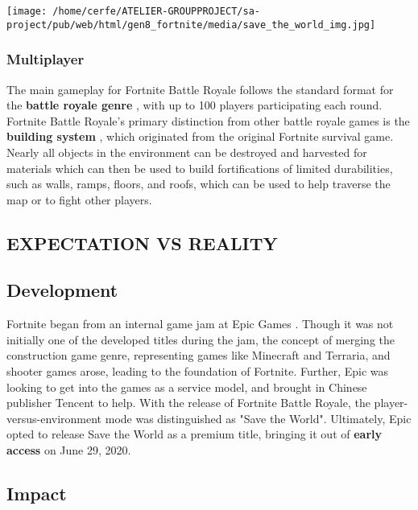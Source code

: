 \documentclass[a4paper,10pt]{book}
\begin{document}
 \texttt{[image: /home/cerfe/ATELIER-GROUPPROJECT/sa-project/pub/web/html/gen8\_fortnite/media/save\_the\_world\_img.jpg]}
 
 \subsubsection{Multiplayer }
 
          The main gameplay for Fortnite Battle Royale follows the standard format for the  \textbf{battle royale genre } , with up to 100 players participating each round.
          Fortnite Battle Royale's primary distinction from other battle royale games is the  \textbf{building system } , which originated from the original Fortnite survival game.
          Nearly all objects in the environment can be destroyed and harvested for materials which can then be used to build fortifications of limited durabilities, such as walls, ramps, floors, and roofs,
          which can be used to help traverse the map or to fight other  players.
         
 
 
 \subsection{EXPECTATION VS REALITY }
 
 
 
 
 
 
 \subsection{Development }
 
          Fortnite began from an internal game jam at Epic Games . Though it was not initially one of the developed titles during the jam, the concept of merging the construction game genre, representing games
          like Minecraft and Terraria, and shooter games arose, leading to the foundation of Fortnite. Further, Epic was looking to get into the games as a service model, and brought in Chinese publisher
          Tencent to help. With the release of Fortnite Battle Royale, the player-versus-environment mode was distinguished as "Save the World". Ultimately, Epic opted to release Save the World as a premium title,
          bringing it out of  \textbf{early access }  on June 29, 2020.
         
 
 \subsection{Impact }
 
\end{document}
